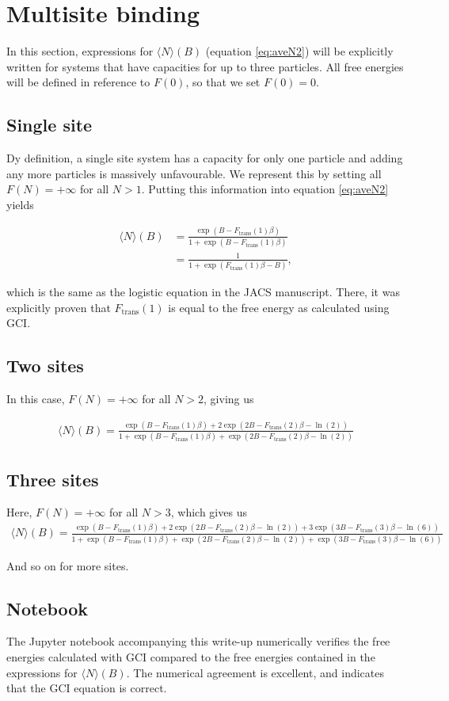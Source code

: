 \documentclass[10pt,a4paper]{article}
\begin{document}
\section{Multisite binding}
In this section, expressions for $\langle N \rangle(B)$ (equation \ref{eq:aveN2}) will be explicitly written for systems that have capacities for up to three particles. All free energies will be defined in reference to $F(0)$, so that we set $F(0)=0$.

\subsection{Single site}
Dy definition, a single site system has a capacity for only one particle and adding any more particles is massively unfavourable. We represent this by setting all $F(N)=+\infty$ for all $N>1$. Putting this information into equation \ref{eq:aveN2} yields

\begin{align*}
\langle N \rangle(B) &= \frac{\exp(B - F_\text{trans}(1)\beta)}{1 + \exp(B - F_\text{trans}(1)\beta)} \\
&= \frac{1}{1 + \exp(F_\text{trans}(1)\beta - B)},
\end{align*}

which is the same as the logistic equation in the JACS manuscript. There, it was explicitly proven that $F_\text{trans}(1)$ is equal to the free energy as calculated using GCI.

\subsection{Two sites}
In this case, $F(N) = +\infty$ for all $N>2$, giving us

\begin{align*}
\langle N \rangle(B) = \frac{\exp(B - F_\text{trans}(1)\beta) + 2\exp(2B - F_\text{trans}(2)\beta - \ln(2))}{1 + \exp(B - F_\text{trans}(1)\beta) + \exp(2B - F_\text{trans}(2)\beta - \ln(2))}
\end{align*}

\subsection{Three sites}
Here, $F(N) = +\infty$ for all $N>3$, which gives us
\begin{align*}
\langle N \rangle(B) = \frac{\exp(B - F_\text{trans}(1)\beta) + 2\exp(2B - F_\text{trans}(2)\beta - \ln(2)) + 3\exp(3B - F_\text{trans}(3)\beta - \ln(6))}{1 + \exp(B - F_\text{trans}(1)\beta) + \exp(2B - F_\text{trans}(2)\beta - \ln(2)) + \exp(3B - F_\text{trans}(3)\beta - \ln(6))}
\end{align*}

And so on for more sites.

\subsection{Notebook}
The Jupyter notebook accompanying this write-up  numerically verifies the free energies calculated with GCI compared to the free energies contained in the expressions for $\langle N \rangle(B)$. The numerical agreement is excellent, and indicates that the GCI equation is correct.
\end{document}
